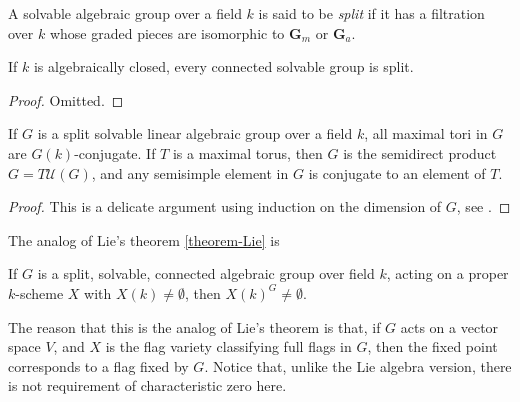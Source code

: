 \begin{definition}
\label{definition-split-solvable}
 A solvable algebraic group over a field $k$ is said to be {\it split} if it has a filtration over $k$ whose graded pieces are isomorphic to $\mathbf G_m$ or $\mathbf G_a$.
\end{definition}

\begin{lemma}
\label{lemma-connected-solvable-split}
 If $k$ is algebraically closed, every connected solvable group is split.
\end{lemma}

\begin{proof}
 Omitted.
\end{proof}

\begin{proposition}
 \label{proposition-Levi-solvable}
If $G$ is a split solvable linear algebraic group over a field $k$, all maximal tori in $G$ are $G(k)$-conjugate. If $T$ is a maximal torus, then $G$ is the semidirect product $G=T\mathcal U(G)$, and any semisimple element in $G$ is conjugate to an element of $T$. 
\end{proposition}

\begin{proof}
 This is a delicate argument using induction on the dimension of $G$, see \cite[Theorem 10.6]{Borel-LAG}. 
\end{proof}





The analog of Lie's theorem \ref{theorem-Lie} is 
\begin{theorem}
\label{theorem-Borel-fixed-point}
 If $G$ is a split, solvable, connected algebraic group over field $k$, acting on a proper $k$-scheme $X$ with $X(k)\ne \emptyset$, then $X(k)^G\ne \emptyset$. 
\end{theorem}

The reason that this is the analog of Lie's theorem is that, if $G$ acts on a vector space $V$, and $X$ is the flag variety classifying full flags in $G$, then the fixed point corresponds to a flag fixed by $G$. Notice that, unlike the Lie algebra version, there is not requirement of characteristic zero here.

